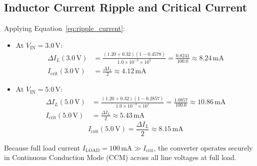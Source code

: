 \documentclass[12pt,a4paper]{article}
\newcommand{\Vin}{V_{\mathrm{IN}}}
\newcommand{\Iload}{I_{\mathrm{LOAD}}}
\newcommand{\dI}{\Delta I_L}
\begin{document}
\subsection{Inductor Current Ripple and Critical Current}
Applying Equation~\eqref{eq:ripple_current}:
\begin{itemize}
    \item At $\Vin = 3.0\,\mathrm{V}$:
    \begin{align*}
        \dI(3.0\,\mathrm{V}) &= \frac{(1.20 + 0.32)(1 - 0.4578)}{1.0\times 10^{-3} \times 10^5} = \frac{0.8241}{100.0} \approx \mathbf{8.24\,\mathrm{mA}} \\
        I_{\mathrm{crit}}(3.0\,\mathrm{V}) &= \frac{\dI}{2} \approx \mathbf{4.12\,\mathrm{mA}}
    \end{align*}
    \item At $\Vin = 5.0\,\mathrm{V}$:
    \begin{align*}
        \dI(5.0\,\mathrm{V}) &= \frac{(1.20 + 0.32)(1 - 0.2857)}{1.0\times 10^{-3} \times 10^5} = \frac{1.0857}{100.0} \approx \mathbf{10.86\,\mathrm{mA}} \\
        I_{\mathrm{crit}}(5.0\,\mathrm{V}) &= \frac{\dI}{2} \approx \mathbf{5.43\,\mathrm{mA}}
    \end{align*}
    \begin{equation*}
        I_{\mathrm{crit}}(5.0\,\mathrm{V}) = \frac{\dI}{2} \approx \mathbf{8.15\,\mathrm{mA}}
    \end{equation*}
\end{itemize}
Because full load current $\Iload = 100\,\mathrm{mA} \gg I_{\mathrm{crit}}$, the converter operates securely in Continuous Conduction Mode (CCM) across all line voltages at full load.
\end{document}
